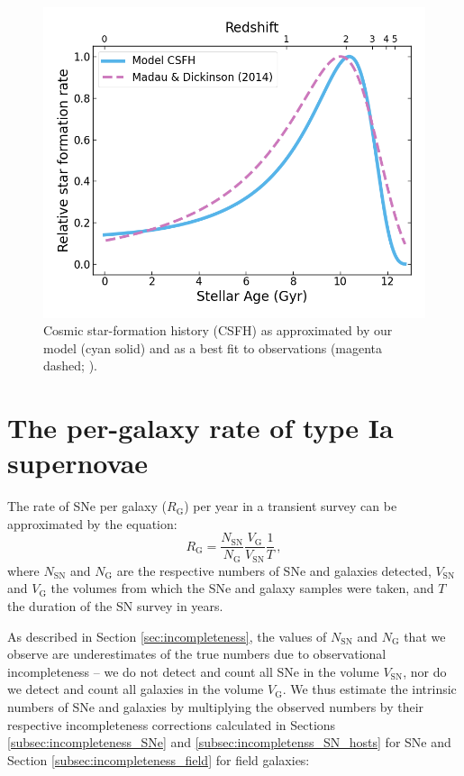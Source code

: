 \documentclass[fleqn,usenatbib]{mnras}
\begin{document}
\begin{figure}
    \centering
    \includegraphics[width=.5\textwidth]{figs/CSFH_MD14.png}
    \caption{Cosmic star-formation history (CSFH) as approximated by our model (cyan solid) and as a best fit to observations (magenta dashed; \citealt{Madau2014}).}%
    \label{fig:csfh}
\end{figure}


\section{The per-galaxy rate of type Ia supernovae}
\label{sec:rates}
The rate of SNe per galaxy ($R_{\mathrm{G}}$) per year in a transient survey can be approximated by the equation:
\begin{equation}
    R_{\mathrm{G}} = \frac{N_{\mathrm{SN}}}{N_{\mathrm{G}}} \frac{V_{\mathrm{G}}}{V_{\mathrm{SN}}}\frac{1}{T}\,,
\label{eq:rate1}
\end{equation}
where $N_{\mathrm{SN}}$ and $N_{\mathrm{G}}$ are the respective numbers of SNe and galaxies detected, $V_{\mathrm{SN}}$ and $V_{\mathrm{G}}$ the volumes from which the SNe and galaxy samples were taken, and $T$ the duration of the SN survey in years. 

As described in Section \ref{sec:incompleteness}, the values of $N_{\mathrm{SN}}$ and $N_{\mathrm{G}}$ that we observe are underestimates of the true numbers due to observational incompleteness -- we do not detect and count all SNe in the volume $V_{\mathrm{SN}}$, nor do we detect and count all galaxies in the volume $V_{\mathrm{G}}$. We thus estimate the intrinsic numbers of SNe and galaxies by multiplying the observed numbers by their respective incompleteness corrections calculated in Sections \ref{subsec:incompleteness_SNe} and \ref{subsec:incompletenss_SN_hosts} for SNe and Section \ref{subsec:incompleteness_field} for field galaxies:
\end{document}
